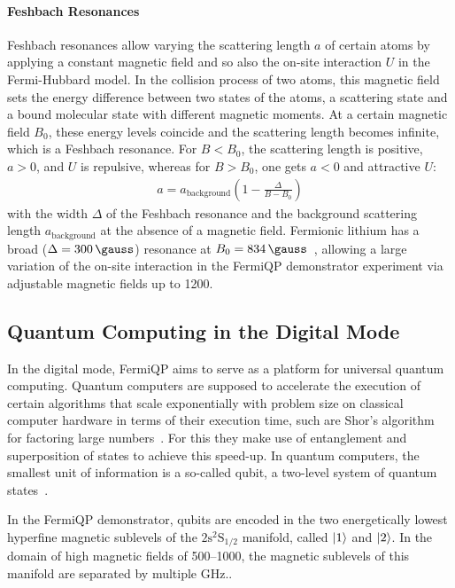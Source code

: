 \paragraph*{Feshbach Resonances} Feshbach resonances allow varying the scattering length $a$ of certain atoms by applying a constant magnetic field and so also the on-site interaction $U$ in the Fermi-Hubbard model. In the collision process of two atoms, this magnetic field sets the energy difference between two states of the atoms, a scattering state and a bound molecular state with different magnetic moments. At a certain magnetic field $B_0$, these energy levels coincide and the scattering length becomes infinite, which is a Feshbach resonance. For $B < B_0$, the scattering length is positive, $a > 0$, and $U$ is repulsive, whereas for $B > B_0$, one gets $a < 0$ and attractive $U$:
\begin{align}
    a = a_\text{background} \left(1 - \frac{\Delta}{B-B_0}\right)
\end{align}
with the width $\Delta$ of the Feshbach resonance and the background scattering length $a_\text{background}$ at the absence of a magnetic field. Fermionic lithium has a broad ($\Delta = \SI[]{300}{\gauss}$) resonance at $B_0 = \SI[]{834}{\gauss}$~\cite{chin_feshbach_2010}, allowing a large variation of the on-site interaction in the FermiQP demonstrator experiment via adjustable magnetic fields up to \SI[]{1200}{\gauss}.

\subsection*{Quantum Computing in the Digital Mode}\label{ch:digital_mode}
In the digital mode, FermiQP aims to serve as a platform for universal quantum computing. Quantum computers are supposed to accelerate the execution of certain algorithms that scale exponentially with problem size on classical computer hardware in terms of their execution time, such are Shor's algorithm for factoring large numbers~\cite{shor_algorithms_1994}. For this they make use of entanglement and superposition of states to achieve this speed-up. In quantum computers, the smallest unit of information is a so-called qubit, a two-level system of quantum states~\cite{nielsen_quantum_2010, hidary_quantum_2021, ladd_quantum_2010, mainzer_quantencomputer_2020}.

In the FermiQP demonstrator, qubits are encoded in the two energetically lowest hyperfine magnetic sublevels of the $2\text{s}^2\text{S}_{1/2}$ manifold, called $\Ket{1}$ and $\Ket{2}$. In the domain of high magnetic fields of \SIrange[]{500}{1000}{\gauss}, the magnetic sublevels of this manifold are separated by multiple \si[]{\giga\hertz}.\cite{gehm_properties_2003,wei_magnetic-field_2013}.

